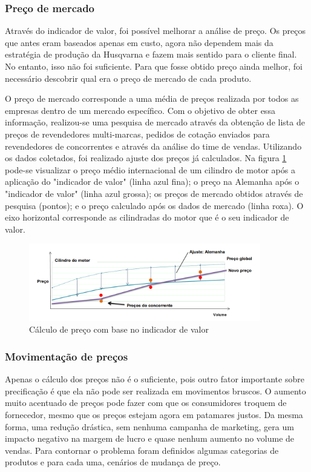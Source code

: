 \documentclass[12pt]{article}
\begin{document}
\subsubsection{Preço de mercado}

	Através do indicador de valor, foi possível melhorar a análise de preço. Os preços que antes eram baseados apenas em custo, agora não dependem mais da estratégia de produção da Husqvarna e fazem mais sentido para o cliente final. No entanto, isso não foi suficiente. Para que fosse obtido preço ainda melhor, foi necessário descobrir qual era o preço de mercado de cada produto.

	O preço de mercado corresponde a uma média de preços realizada por todos as empresas dentro de um mercado específico. Com o objetivo de obter essa informação, realizou-se uma pesquisa de mercado através da obtenção de lista de preços de revendedores multi-marcas, pedidos de cotação enviados para revendedores de concorrentes e através da análise do time de vendas. Utilizando os dados coletados, foi realizado ajuste dos preços já calculados. Na figura \ref{fig:competitor} pode-se visualizar o preço médio internacional de um cilindro de motor após a aplicação do "indicador de valor" (linha azul fina); o preço na Alemanha após o "indicador de valor" (linha azul grossa); os preços de mercado obtidos através de pesquisa (pontos); e o preço calculado após os dados de mercado (linha roxa). O eixo horizontal corresponde as cilindradas do motor que é o seu indicador de valor.

\begin{figure}[h!]
	\centering
	\includegraphics[width=0.9\textwidth]{img/wettbewerber-pt.png}
	\caption{Cálculo de preço com base no indicador de valor}
	\label{fig:competitor}
\end{figure}

\subsubsection{Movimentação de preços}

	Apenas o cálculo dos preços não é o suficiente, pois outro fator importante sobre precificação é que ela não pode ser realizada em movimentos bruscos. O aumento muito acentuado de preços pode fazer com que os consumidores troquem de fornecedor, mesmo que os preços estejam agora em patamares justos. Da mesma forma, uma redução drástica, sem nenhuma campanha de marketing, gera um impacto negativo na margem de lucro e quase nenhum aumento no volume de vendas. Para contornar o problema foram definidos algumas categorias de produtos e para cada uma, cenários de mudança de preço.
\end{document}
